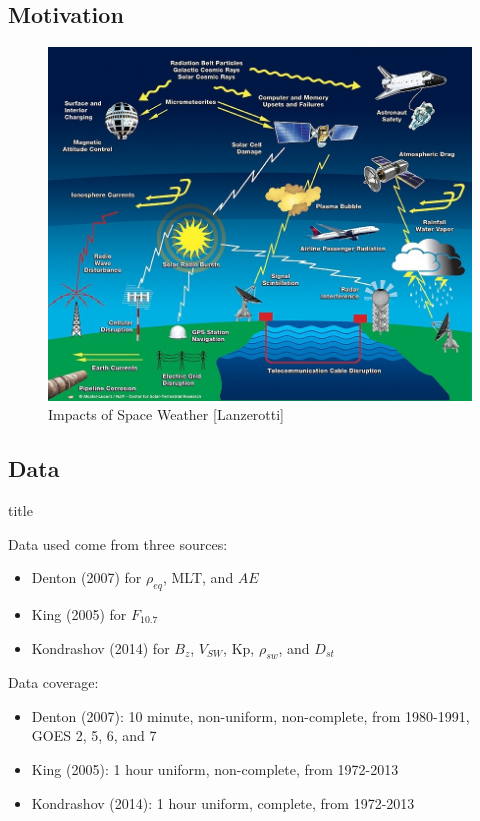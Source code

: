 \documentclass[xcolor={dvipsnames,table}]{beamer}
\newcommand{\subheader}{    		\begin{center}
  	\begin{beamercolorbox}[sep=4pt,center,shadow=true,rounded=true]{title}
  		\usebeamerfont{title}\subsecname\par%
  	\end{beamercolorbox}
  	\vfill
  	\end{center}}
\newcommand{\req}{\ensuremath{\rho_{eq}}} %
\newcommand{\f}{\ensuremath{F_{10.7}}} %
\begin{document}
\subsection{Motivation}
\begin{frame}
	\begin{figure}
		\centering
		\includegraphics[width=0.75\linewidth]{Figures/TE_space_weather_diagram}
		\caption{Impacts of Space Weather [Lanzerotti]}
		\label{fig:TE_space_weather_diagram}
	\end{figure}
\end{frame}




\subsection{Data}

\begin{frame}
	\subheader
	Data used come from three sources:
	\small
	\begin{itemize}
		\item Denton (2007) for \req, MLT, and $AE$ \\
		\item King (2005) for \f
		\item Kondrashov (2014) for $B_z$, $V_{SW}$, Kp, $\rho_{sw}$, and $D_{st}$ \\
	\end{itemize}
\end{frame}

\begin{frame}
	Data coverage:
	\begin{itemize}
		\item Denton (2007): 10 minute, non-uniform, non-complete, from 1980-1991, GOES 2, 5, 6, and 7
		\item King (2005): 1 hour uniform, non-complete, from 1972-2013
		\item Kondrashov (2014): 1 hour uniform, complete, from 1972-2013
	\end{itemize}
\end{frame}
\end{document}
